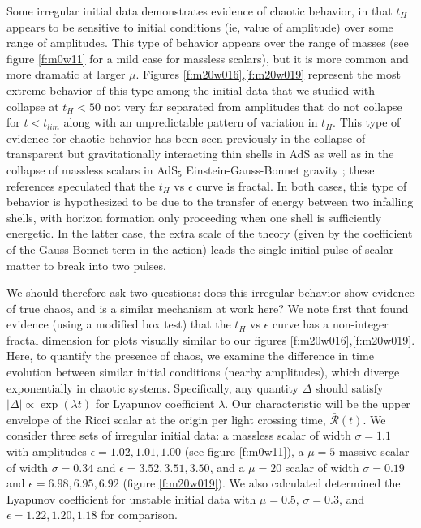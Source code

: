 \documentclass[../PhD.tex]{subfiles}
\begin{document}
Some irregular initial data demonstrates evidence of chaotic behavior,
in that $t_H$ appears to be sensitive to initial conditions 
(ie, value of amplitude) over some range of amplitudes. 
This type of behavior appears over the range
of masses (see figure \ref{f:m0w11} for a mild case for massless scalars),
but it
is more common and more dramatic at larger $\mu$. Figures
\ref{f:m20w016},\ref{f:m20w019} represent the most extreme behavior of
this type
among the initial data that we studied with collapse at $t_H<50$ not very
far separated from amplitudes that do not collapse for $t<t_{lim}$ along with
an unpredictable pattern of variation in $t_H$.  This type of 
evidence for chaotic behavior
has been seen previously in the collapse of transparent but gravitationally
interacting thin shells in AdS \cite{1602.03535} as well as in the
collapse of massless scalars in AdS$_5$ Einstein-Gauss-Bonnet gravity
\cite{1410.1869,1608.05402}; these references speculated that the 
$t_H$ vs $\epsilon$ curve is fractal. In both cases, this type of behavior is
hypothesized to be due to the transfer of energy between two infalling shells,
with horizon formation only proceeding when one shell is sufficiently
energetic.  In the latter case, the extra scale of the theory
(given by the coefficient of the Gauss-Bonnet term in the action) leads the
single initial pulse of scalar matter to break into two pulses.

We should therefore ask two questions: does this irregular behavior show
evidence of true chaos, and is a similar mechanism at work here? We note first
that \cite{1608.05402} found evidence (using a modified box test) that the
$t_H$ vs $\epsilon$ curve has a non-integer fractal dimension 
for plots visually similar to our figures \ref{f:m20w016},\ref{f:m20w019}.
Here, to quantify the presence of chaos, 
we examine the difference in time evolution between
similar initial conditions (nearby amplitudes), which diverge exponentially
in chaotic systems. Specifically, any quantity $\Delta$ should satisfy
$|\Delta| \propto \exp(\lambda t)$ for Lyapunov coefficient $\lambda$.
Our characteristic will be the
upper envelope of the Ricci scalar at the origin per light crossing time,
$\bar{\mathcal R}(t)$. We consider three sets of irregular initial data: 
a massless scalar of width $\sigma = 1.1$ with amplitudes
$\epsilon=1.02,1.01,1.00$ (see figure \ref{f:m0w11}),
a $\mu = 5$ massive scalar of width $\sigma = 0.34$ and
$\epsilon=3.52,3.51,3.50$, and a $\mu = 20$ scalar of width $\sigma = 0.19$
and $\epsilon=6.98,6.95,6.92$ (figure \ref{f:m20w019}). 
We also calculated determined the Lyapunov coefficient for unstable initial
data with $\mu=0.5$, $\sigma=0.3$, and $\epsilon=1.22,1.20,1.18$ for 
comparison.
\end{document}
